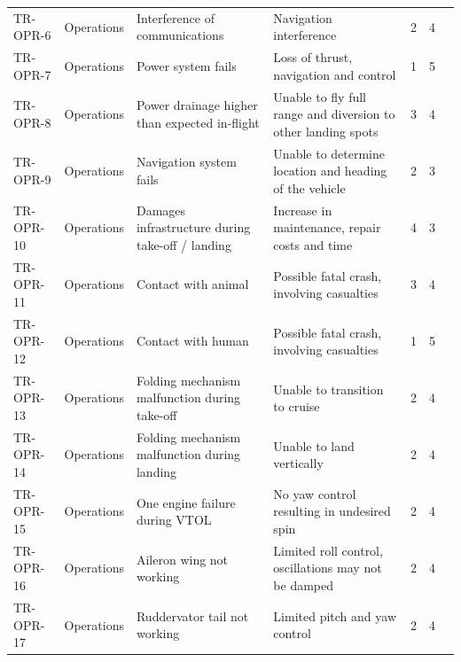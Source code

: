 \begin{table}[H]
{\begin{tabular}{lcllccS[table-format=1.1,round-mode=places,round-precision=1,round-pad=true]}
TR-OPR-6  & Operations  & Interference of  communications                  & Navigation interference                                       & 2                & 4      &   \\
TR-OPR-7  & Operations  & Power system fails                               & Loss of thrust, navigation and control                        & 1                & 5      &     \\
TR-OPR-8  & Operations  & Power drainage higher than expected in-flight    & Unable to fly full range and diversion to other landing spots & 3                & 4      &   \\
TR-OPR-9  & Operations  & Navigation system fails                          & Unable to determine location and heading of the vehicle       & 2                & 3      &   \\
TR-OPR-10 & Operations  & Damages infrastructure during take-off / landing & Increase in maintenance, repair costs and time                & 4                & 3      &   \\
TR-OPR-11 & Operations  & Contact with animal                              & Possible fatal crash, involving casualties                    & 3                & 4      &   \\
TR-OPR-12 & Operations  & Contact with human                               & Possible fatal crash, involving casualties                    & 1                & 5      &     \\
TR-OPR-13 & Operations  & Folding mechanism malfunction during take-off    & Unable to transition to cruise                                & 2                & 4      &   \\
TR-OPR-14 & Operations  & Folding mechanism malfunction during landing     & Unable to land vertically                                     & 2                & 4      &   \\
TR-OPR-15 & Operations  & One engine failure during VTOL                   & No yaw control resulting in undesired spin                    & 2                & 4      &   \\
TR-OPR-16 & Operations  & Aileron wing not working                         & Limited roll control, oscillations may not be damped          & 2                & 4      &   \\
TR-OPR-17 & Operations  & Ruddervator tail not working                     & Limited pitch and yaw control                                 & 2                & 4      &   \\

\end{tabular}}
\end{table}
